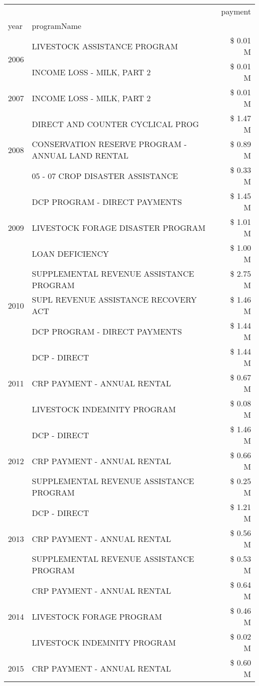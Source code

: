 \begin{tabular}{llr}
\toprule
 &  & payment \\
year & programName &  \\
\midrule
\multirow[t]{2}{*}{2006} & LIVESTOCK ASSISTANCE PROGRAM & \$ 0.01 M \\
 & INCOME LOSS - MILK, PART 2 & \$ 0.01 M \\
\cline{1-3}
2007 & INCOME LOSS - MILK, PART 2 & \$ 0.01 M \\
\cline{1-3}
\multirow[t]{3}{*}{2008} & DIRECT AND COUNTER CYCLICAL PROG & \$ 1.47 M \\
 & CONSERVATION RESERVE PROGRAM - ANNUAL LAND RENTAL & \$ 0.89 M \\
 & 05 - 07 CROP DISASTER ASSISTANCE & \$ 0.33 M \\
\cline{1-3}
\multirow[t]{3}{*}{2009} & DCP PROGRAM - DIRECT PAYMENTS & \$ 1.45 M \\
 & LIVESTOCK FORAGE DISASTER  PROGRAM & \$ 1.01 M \\
 & LOAN DEFICIENCY & \$ 1.00 M \\
\cline{1-3}
\multirow[t]{3}{*}{2010} & SUPPLEMENTAL REVENUE ASSISTANCE PROGRAM & \$ 2.75 M \\
 & SUPL REVENUE ASSISTANCE RECOVERY ACT & \$ 1.46 M \\
 & DCP PROGRAM - DIRECT PAYMENTS & \$ 1.44 M \\
\cline{1-3}
\multirow[t]{3}{*}{2011} & DCP - DIRECT & \$ 1.44 M \\
 & CRP PAYMENT - ANNUAL RENTAL & \$ 0.67 M \\
 & LIVESTOCK INDEMNITY PROGRAM & \$ 0.08 M \\
\cline{1-3}
\multirow[t]{3}{*}{2012} & DCP - DIRECT & \$ 1.46 M \\
 & CRP PAYMENT - ANNUAL RENTAL & \$ 0.66 M \\
 & SUPPLEMENTAL REVENUE ASSISTANCE PROGRAM & \$ 0.25 M \\
\cline{1-3}
\multirow[t]{3}{*}{2013} & DCP - DIRECT & \$ 1.21 M \\
 & CRP PAYMENT - ANNUAL RENTAL & \$ 0.56 M \\
 & SUPPLEMENTAL REVENUE ASSISTANCE PROGRAM & \$ 0.53 M \\
\cline{1-3}
\multirow[t]{3}{*}{2014} & CRP PAYMENT - ANNUAL RENTAL & \$ 0.64 M \\
 & LIVESTOCK FORAGE PROGRAM & \$ 0.46 M \\
 & LIVESTOCK INDEMNITY PROGRAM & \$ 0.02 M \\
\cline{1-3}
\multirow[t]{3}{*}{2015} & CRP PAYMENT - ANNUAL RENTAL & \$ 0.60 M \\

\end{tabular}
